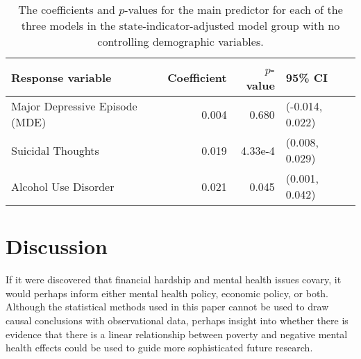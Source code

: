 \documentclass{article}
\begin{document}
\begin{table}[t]
\begin{center}
\begin{tabular}{l r r l}
    \toprule
    Response variable & Coefficient & $p$-value & 95\% CI\\
    \midrule
    Major Depressive Episode (MDE) & 0.004 & 0.680 & (-0.014, 0.022)\\
    Suicidal Thoughts & 0.019 & 4.33e-4 & (0.008, 0.029)\\
    Alcohol Use Disorder & 0.021 & 0.045 & (0.001, 0.042)\\
    \bottomrule
\end{tabular}
\caption{\label{tab:state-ind-only-model-results} The coefficients and $p$-values
    for the main predictor for each of the three models
    in the state-indicator-adjusted model group with no controlling demographic variables.
}
\end{center}
\end{table}


\section{Discussion}


If it were discovered that financial hardship and mental
health issues covary, it would perhaps inform
either mental health policy, economic policy, or both.
Although the statistical methods used in this paper
cannot be used to draw causal conclusions with observational data,
perhaps insight into whether there is evidence that there
is a linear relationship between poverty and negative mental health effects
could be used to guide more sophisticated future research.
\end{document}
